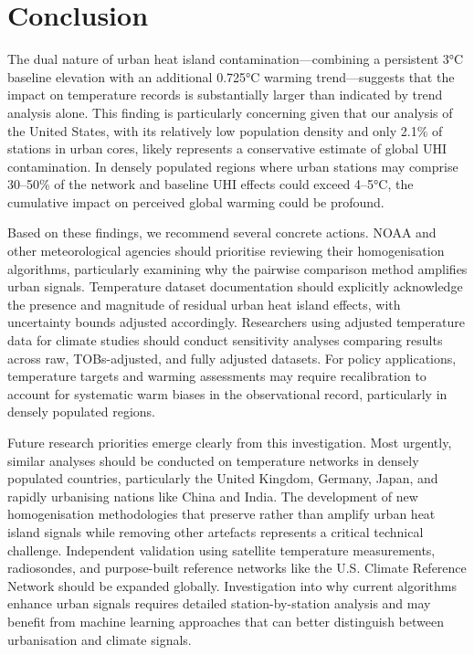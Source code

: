 \documentclass[11pt, a4paper]{article}
\begin{document}
\section{Conclusion}

The dual nature of urban heat island contamination—combining a persistent 3°C baseline elevation with an additional 0.725°C warming trend—suggests that the impact on temperature records is substantially larger than indicated by trend analysis alone. This finding is particularly concerning given that our analysis of the United States, with its relatively low population density and only 2.1\% of stations in urban cores, likely represents a conservative estimate of global UHI contamination. In densely populated regions where urban stations may comprise 30--50\% of the network and baseline UHI effects could exceed 4--5°C, the cumulative impact on perceived global warming could be profound.

Based on these findings, we recommend several concrete actions. NOAA and other meteorological agencies should prioritise reviewing their homogenisation algorithms, particularly examining why the pairwise comparison method amplifies urban signals. Temperature dataset documentation should explicitly acknowledge the presence and magnitude of residual urban heat island effects, with uncertainty bounds adjusted accordingly. Researchers using adjusted temperature data for climate studies should conduct sensitivity analyses comparing results across raw, TOBs-adjusted, and fully adjusted datasets. For policy applications, temperature targets and warming assessments may require recalibration to account for systematic warm biases in the observational record, particularly in densely populated regions.

Future research priorities emerge clearly from this investigation. Most urgently, similar analyses should be conducted on temperature networks in densely populated countries, particularly the United Kingdom, Germany, Japan, and rapidly urbanising nations like China and India. The development of new homogenisation methodologies that preserve rather than amplify urban heat island signals while removing other artefacts represents a critical technical challenge. Independent validation using satellite temperature measurements, radiosondes, and purpose-built reference networks like the U.S. Climate Reference Network should be expanded globally. Investigation into why current algorithms enhance urban signals requires detailed station-by-station analysis and may benefit from machine learning approaches that can better distinguish between urbanisation and climate signals.
\end{document}
